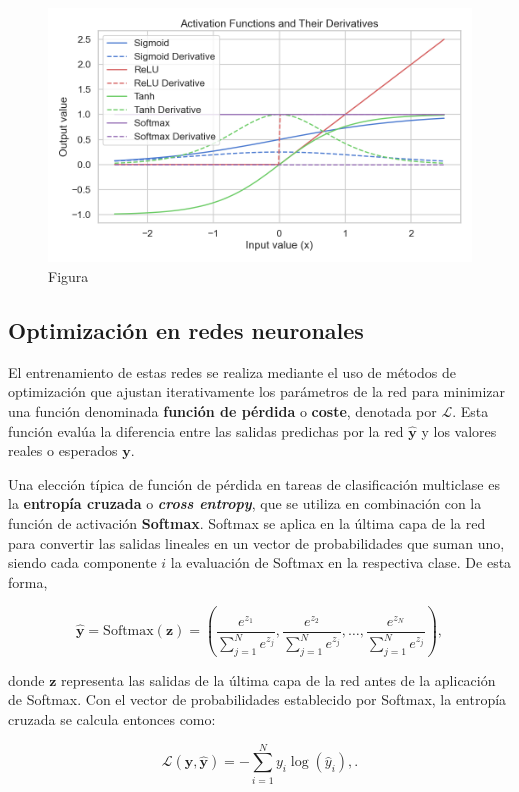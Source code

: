 \begin{figure}
	\centering
	\includegraphics[width=12cm]{img/activation_functions_figure.png}
	\caption{Figura}
\end{figure}

\subsection{Optimización en redes neuronales}

El entrenamiento de estas redes se realiza mediante el uso de métodos de optimización que ajustan iterativamente los parámetros de la red para minimizar una función denominada \textbf{función de pérdida} o \textbf{coste}, denotada por \(\mathcal{L}\). Esta función evalúa la diferencia entre las salidas predichas por la red \(\mathbf{\hat{y}}\) y los valores reales o esperados \(\mathbf{y}\).

Una elección típica de función de pérdida en tareas de clasificación multiclase es la \textbf{entropía cruzada} o \textbf{\textit{cross entropy}}, que se utiliza en combinación con la función de activación \textbf{Softmax}. Softmax se aplica en la última capa de la red para convertir las salidas lineales en un vector de probabilidades que suman uno, siendo cada componente $i$ la evaluación de Softmax en la respectiva clase. De esta forma,

\[
\mathbf{\hat{y}} = \text{Softmax}(\mathbf{z}) = \left(\frac{e^{z_1}}{\sum_{j=1}^{N} e^{z_j}}, \frac{e^{z_2}}{\sum_{j=1}^{N} e^{z_j}}, \ldots, \frac{e^{z_N}}{\sum_{j=1}^{N} e^{z_j}}\right),
\]

donde \(\mathbf{z}\) representa las salidas de la última capa de la red antes de la aplicación de Softmax. Con el vector de probabilidades establecido por Softmax, la entropía cruzada se calcula entonces como:

\[
\mathcal{L}(\mathbf{y}, \mathbf{\hat{y}}) = -\sum_{i=1}^{N} y_i \log(\hat{y}_i),.
\]

